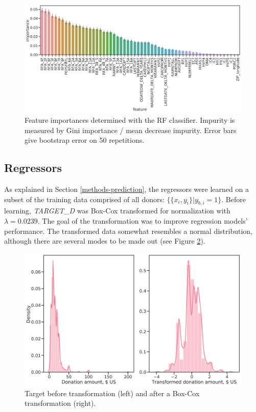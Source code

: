 \documentclass[
  11pt,
  a4paper,
  DIV=12,captions=tableheading,oneside,titlepage]{scrbook}
\begin{document}
\begin{figure}

{\centering \includegraphics[width=1\linewidth]{figures/learning/feature-importance-rf-classification} 

}

\caption{Feature importances determined with the RF classifier. Impurity is measured by Gini importance / mean decrease impurity. Error bars give bootstrap error on 50 repetitions.}\label{fig:importances}
\end{figure}

\hypertarget{regressors-1}{%
\subsection{Regressors}\label{regressors-1}}

As explained in Section \ref{methods-prediction}, the regressors were learned on a subset of the training data comprised of all donors: \(\{\{x_i, y_i\}|y_{b,i} = 1\}\). Before learning, \emph{TARGET\_D} was Box-Cox transformed for normalization with \(\lambda=0.0239\). The goal of the transformation was to improve regression models' performance. The transformed data somewhat resembles a normal distribution, although there are several modes to be made out (see Figure \ref{fig:reg-targ-transform}).

\begin{figure}

{\centering \includegraphics[width=0.7\linewidth]{figures/learning/target_d-distributions-before-after-transformation} 

}

\caption{Target before transformation (left) and after a Box-Cox transformation (right).}\label{fig:reg-targ-transform}
\end{figure}
\end{document}
